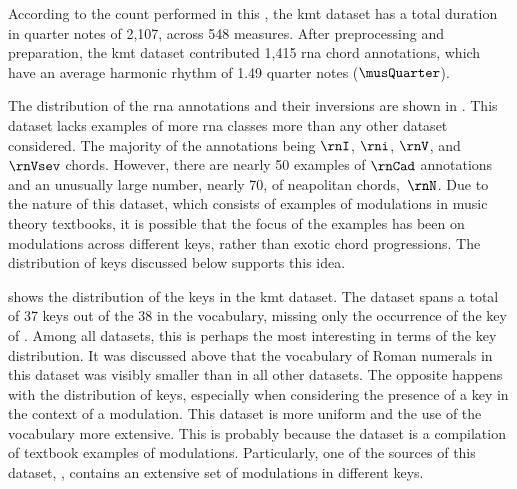 
According to the count performed in this \thesisdiss{}, the
\gls{kmt} dataset has a total duration in quarter notes of
2,107, across 548 measures. After preprocessing and
preparation, the \gls{kmt} dataset contributed 1,415
\gls{rna} chord annotations, which have an average harmonic
rhythm of 1.49 quarter notes ($\musQuarter$).

The distribution of the \gls{rna} annotations and their
inversions are shown in . This
dataset lacks examples of more \gls{rna} classes more than
any other dataset considered. The majority of the
annotations being $\rnI$, $\rni$, $\rnV$, and $\rnVsev$
chords. However, there are nearly 50 examples of $\rnCad$
annotations and an unusually large number, nearly 70, of
\gls{neapolitan} chords,~$\rnN$. Due to the nature of this
dataset, which consists of examples of modulations in music
theory textbooks, it is possible that the focus of the
examples has been on modulations across different keys,
rather than exotic chord progressions. The distribution of
keys discussed below supports this idea.



 shows the distribution of the keys
in the \gls{kmt} dataset. The dataset spans a total of 37
keys out of the 38 in the vocabulary, missing only the
occurrence of the key of \keyBbb{}. Among all datasets, this
is perhaps the most interesting in terms of the key
distribution. It was discussed above that the vocabulary of
Roman numerals in this dataset was visibly smaller than in
all other datasets. The opposite happens with the
distribution of keys, especially when considering the
presence of a key in the context of a modulation. This
dataset is more uniform and the use of the vocabulary more
extensive. This is probably because the dataset is a
compilation of textbook examples of modulations.
Particularly, one of the sources of this dataset,
\textcite{reger1904supplement}, contains an extensive set of
modulations in different keys.
